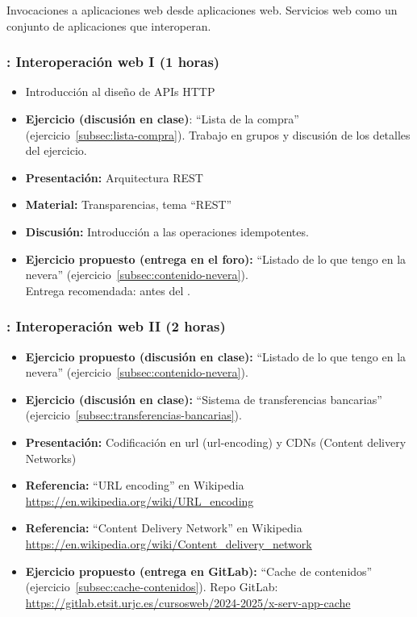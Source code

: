 \documentclass[a4paper,12pt]{article}
\begin{document}
Invocaciones a aplicaciones web desde aplicaciones web. Servicios web como un conjunto de aplicaciones que interoperan.

\subsubsection{\martesE: Interoperación web I (1 horas)}
\label{cal:martesE}

\begin{itemize}
\item Introducción al diseño de APIs HTTP
\item \textbf{Ejercicio (discusión en clase)}: ``Lista de la compra'' (ejercicio~\ref{subsec:lista-compra}).
  Trabajo en grupos y discusión de los detalles del ejercicio.
\item \textbf{Presentación:} Arquitectura REST
\item \textbf{Material:} Transparencias, tema ``REST''
\item \textbf{Discusión:} Introducción a las operaciones idempotentes.
\item \textbf{Ejercicio propuesto (entrega en el foro):} ``Listado de lo que tengo en la nevera'' (ejercicio~\ref{subsec:contenido-nevera}). \\
  Entrega recomendada: antes del \martesF.
\end{itemize}

\subsubsection{\martesF: Interoperación web II (2 horas)}
\label{cal:martesF}

\begin{itemize}

\item \textbf{Ejercicio propuesto (discusión en clase):} ``Listado de lo que tengo en la nevera'' (ejercicio~\ref{subsec:contenido-nevera}).
\item \textbf{Ejercicio (discusión en clase):} ``Sistema de transferencias bancarias'' (ejercicio~\ref{subsec:transferencias-bancarias}).
\item \textbf{Presentación:} Codificación en url (url-encoding) y CDNs (Content delivery Networks)
\item \textbf{Referencia:} ``URL encoding'' en Wikipedia \\ \url{https://en.wikipedia.org/wiki/URL_encoding}
\item \textbf{Referencia:} ``Content Delivery Network'' en Wikipedia \\ \url{https://en.wikipedia.org/wiki/Content_delivery_network}
\item \textbf{Ejercicio propuesto (entrega en GitLab):} ``Cache de contenidos'' (ejercicio~\ref{subsec:cache-contenidos}).
  Repo GitLab: \url{https://gitlab.etsit.urjc.es/cursosweb/2024-2025/x-serv-app-cache} 

\end{itemize}
\end{document}

